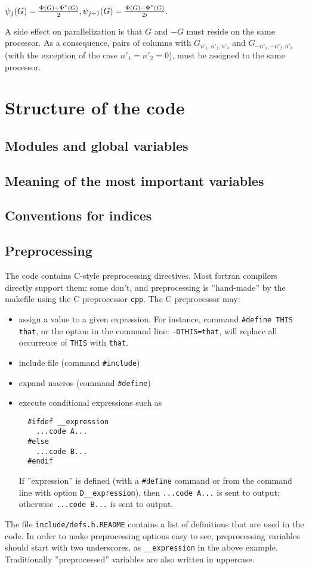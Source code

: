\documentclass[12pt,a4paper]{article}
\begin{document}
$
   \psi_j    (G) =  {\Phi(G) + \Phi^*(G)\over 2},
   \psi_{j+1}(G) =  {\Phi(G) - \Phi^*(G)\over 2i}.
$

A side effect on parallelization is that $G$ and $-G$ must
reside on the same processor. As a consequence, pairs of columns
with $G_{n'_1,n'_2,n'_3}$ and $G_{-n'_1,-n'_2,n'_3}$
(with the exception of the case $n'_1=n'_2=0$),
must be assigned to the same processor.

\section{ Structure of the code}
\subsection{Modules and global variables}
\subsection{Meaning of the most important variables}
\subsection{Conventions for indices}
\subsection{Preprocessing}

The code contains C-style preprocessing directives. Most fortran compilers directly support them; some don't, and preprocessing is ''hand-made'' by the makefile using the C preprocessor \texttt{cpp}. The C preprocessor may:
\begin{itemize}
\item assign a value to a given expression. For instance, command \texttt{\#define THIS that}, or the option in the command line: \texttt{-DTHIS=that}, will replace all occurrence of \texttt{THIS} with \texttt{that}.
\item include file (command \texttt{\#include})
\item expand macros (command \texttt{\#define})
\item execute conditional expressions such as
\begin{verbatim}
  #ifdef __expression
    ...code A...
  #else
    ...code B...
  #endif
\end{verbatim}
If ''expression'' is defined (with a \texttt{\#define} command 
or from the command line with option \texttt{\-D\_\_expression}), 
then  \texttt{...code A...} is sent to output; otherwise 
\texttt{...code B...} is sent to output.

\end{itemize}
The file \texttt{include/defs.h.README} contains a list of definitions that are used in the code. In order to make  preprocessing options easy to see, preprocessing variables should start with 
two underscores, as \texttt{\_\_expression} in the above example. Traditionally ''preprocessed'' variables are also written in uppercase.
\end{document}
